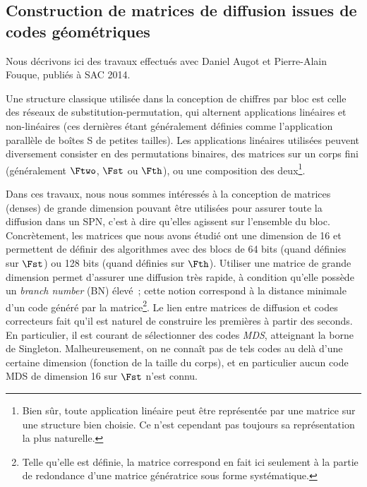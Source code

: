 \subsection[{Construction de matrices de diffusion issues de codes géométriques \cite{DBLP:conf/sacrypt/AugotFK14}}]{Construction de matrices de diffusion issues de codes géométriques~\cite{DBLP:conf/sacrypt/AugotFK14}}

Nous décrivons ici des travaux effectués avec Daniel Augot et Pierre-Alain Fouque, publiés à SAC 2014.

\medskip

Une structure classique utilisée dans la conception de chiffres par bloc est celle des réseaux de substitution-permutation, qui alternent applications linéaires et non-linéaires (ces dernières étant
généralement définies comme l'application parallèle de boîtes S de petites tailles). Les applications linéaires utilisées peuvent diversement consister en des permutations binaires, des matrices sur
un corps fini (généralement $\Ftwo$, $\Fst$ ou $\Fth$), ou une composition des deux\footnote{Bien sûr, toute application linéaire peut être représentée par une matrice sur une structure bien choisie. Ce n'est
cependant pas toujours sa représentation la plus naturelle.}.

Dans ces travaux, nous nous sommes intéressés à la conception de matrices (denses)
de grande dimension pouvant être utilisées pour assurer toute la diffusion dans un SPN, c'est à dire qu'elles agissent sur l'ensemble du bloc. Concrètement, les matrices que nous
avons étudié ont une dimension de 16
et permettent de définir des algorithmes avec des blocs de 64 bits (quand définies sur $\Fst$) ou 128 bits (quand définies sur $\Fth$).
Utiliser une matrice de grande dimension permet d'assurer une diffusion très rapide, à condition qu'elle possède un \emph{branch number} (BN) élevé~; cette notion correspond à la
distance minimale d'un code généré par la matrice\footnote{Telle qu'elle est définie, la matrice correspond en fait ici seulement à la partie de redondance d'une matrice génératrice sous forme systématique.}.
Le lien entre matrices de diffusion et codes correcteurs fait qu'il est naturel de construire les premières à partir des seconds. En particulier, il est courant de sélectionner
des codes \emph{MDS}, atteignant la borne de Singleton. Malheureusement, on ne connaît pas de tels codes au delà d'une certaine dimension (fonction de la taille du corps), et en particulier
aucun code MDS de dimension 16 sur $\Fst$ n'est connu.


